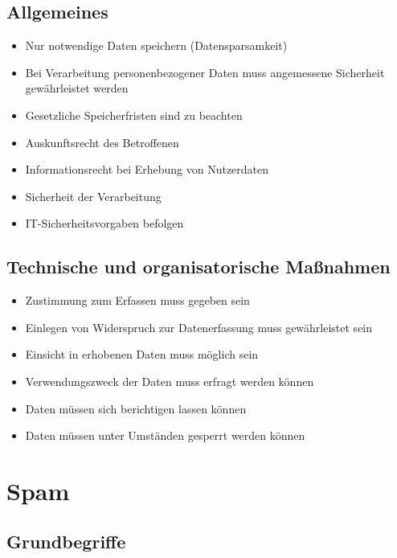 \subsection{Allgemeines}
\begin{frame}
\begin{itemize}
	\item Nur notwendige Daten speichern (Datensparsamkeit)
	\item Bei Verarbeitung personenbezogener Daten muss angemessene Sicherheit gewährleistet werden
	\item Gesetzliche Speicherfristen sind zu beachten
	\item Auskunftsrecht des Betroffenen
	\item Informationsrecht bei Erhebung von Nutzerdaten
	\item Sicherheit der Verarbeitung
	\item IT-Sicherheitsvorgaben befolgen
\end{itemize}
\end{frame}

\subsection{Technische und organisatorische Maßnahmen}
\begin{frame}
\begin{itemize}
	\item Zustimmung zum Erfassen muss gegeben sein
	\item Einlegen von Widerspruch zur Datenerfassung muss gewährleistet sein
	\item Einsicht in erhobenen Daten muss möglich sein
	\item Verwendungszweck der Daten muss erfragt werden können
	\item Daten müssen sich berichtigen lassen können
	\item Daten müssen unter Umständen gesperrt werden können
\end{itemize}
\end{frame}

\section{Spam}

\subsection{Grundbegriffe}

